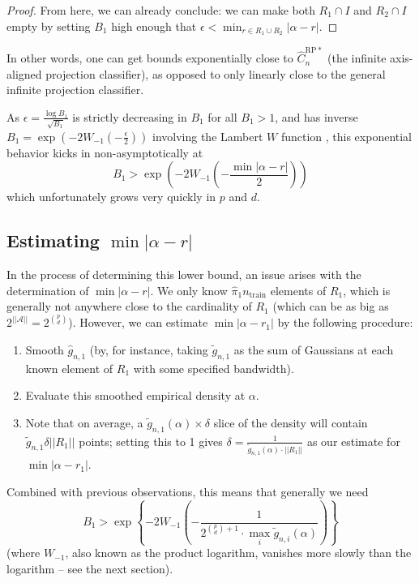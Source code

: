 \documentclass[ejs,preprint]{imsart}
\newcommand\crpnhatstar{\hat{C}_{n}^{\mathrm{RP*}}}
\begin{document}
\begin{proof}
From here, we can already conclude: we can make both $R_{1}\cap I$
and $R_{2}\cap I$ empty by setting $B_{1}$ high enough that $\epsilon<\min_{r\in R_{1}\cup R_{2}}|\alpha-r|$.
\end{proof}

In other words, one can get bounds exponentially close to $\crpnhatstar$
(the infinite axis-aligned projection classifier), as opposed to only
linearly close to the general infinite projection classifier.

As $\epsilon=\frac{\log B_{1}}{\sqrt{B_{1}}}$ is strictly decreasing in $B_{1}$ for all $B_{1}>1$, and has inverse $B_{1}=\exp\left(-2W_{-1}(-\frac{\epsilon}{2})\right)$ involving the Lambert $W$ function \cite{CGHJK96}, this exponential behavior kicks in non-asymptotically at
\[
B_{1}>\exp\left(-2W_{-1}\left(-\frac{\min|\alpha-r|}{2}\right)\right)
\]
which unfortunately grows very quickly in $p$ and $d$.

\subsection{Estimating $\min|\alpha-r|$}

In the process of determining this lower bound, an issue arises with the determination of $\min|\alpha-r|$.
We only know $\hat{\pi}_{1}n_{\mathrm{train}}$ elements of $R_{1}$, which is generally not anywhere close to the cardinality of $R_{1}$ (which can be as big as $2^{||\mathcal{A}||}=2^{\binom{p}{d}}$).
However, we can estimate $\min|\alpha-r_{1}|$ by the following procedure:
\begin{enumerate}
\item Smooth $\hat{g}_{n,1}$ (by, for instance, taking $\tilde{g}_{n,1}$
as the sum of Gaussians at each known element of $R_{1}$ with some
specified bandwidth).
\item Evaluate this smoothed empirical density at $\alpha$.
\item Note that on average, a $\tilde{g}_{n,1}(\alpha)\times\delta$ slice
of the density will contain $\tilde{g}_{n,1}\delta||R_{1}||$ points;
setting this to 1 gives $\delta=\frac{1}{\tilde{g}_{n,1}(\alpha)\cdot||R_{1}||}$
as our estimate for $\min|\alpha-r_{1}|$.
\end{enumerate}
Combined with previous observations, this means that generally we
need 
\[
B_{1}>\exp\left\{ -2W_{-1}\left(-\frac{1}{2^{\binom{p}{d}+1}\cdot\max_i\tilde{g}_{n,i}(\alpha)}\right)\right\} 
\]
 (where $W_{-1}$, also known as the product logarithm, vanishes
more slowly than the logarithm -- see the next section).
\end{document}
